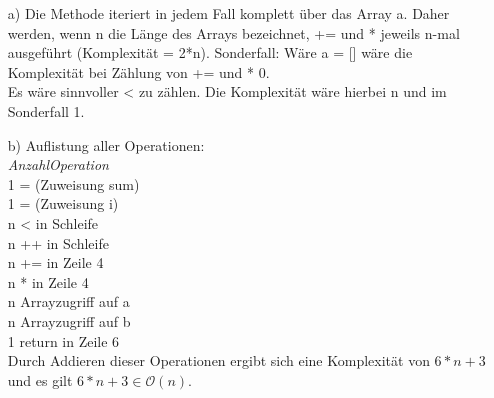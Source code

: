 \documentclass[11pt]{article}
\begin{document}
\begin{itemize}
	\item[a)]
		Die Methode iteriert in jedem Fall komplett über das Array a. Daher werden, wenn n die Länge des Arrays bezeichnet, += und * jeweils n-mal ausgeführt (Komplexität = 2*n).
		Sonderfall: Wäre a = [] wäre die Komplexität bei Zählung von += und * 0.\\
		Es wäre sinnvoller < zu zählen. Die Komplexität wäre hierbei n und im Sonderfall 1.
	\item[b)]
		Auflistung aller Operationen:\\
		\hspace*{7mm}\textit{Anzahl}\hspace*{8mm}\textit{Operation}\\
		\hspace*{10mm} 1 \hspace*{10mm} = (Zuweisung sum) \\
		\hspace*{10mm} 1 \hspace*{10mm} = (Zuweisung i)\\
		\hspace*{10mm} n \hspace*{10mm} < in Schleife\\
		\hspace*{10mm} n \hspace*{10mm} ++ in Schleife\\
		\hspace*{10mm} n \hspace*{10mm} += in Zeile 4\\
		\hspace*{10mm} n \hspace*{10mm} * in Zeile 4\\
		\hspace*{10mm} n \hspace*{10mm} Arrayzugriff auf a\\
		\hspace*{10mm} n \hspace*{10mm} Arrayzugriff auf b\\
		\hspace*{10mm} 1 \hspace*{10mm} return in Zeile 6\\
		Durch Addieren dieser Operationen ergibt sich eine Komplexität von $6*n+3$ und es gilt $6*n+3 \in \mathcal{O}(n)$.
\end{itemize}
\end{document}
